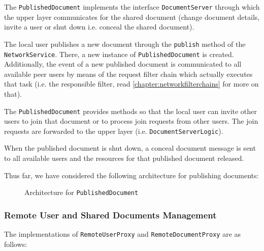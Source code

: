 The \texttt{PublishedDocument} implements the interface \texttt{DocumentServer} through which the upper layer communicates for the shared document (change document details, invite a user or shut down i.e. conceal the shared document).

The local user publishes a new document through the \texttt{publish} method of the \texttt{NetworkService}. There, a new instance of \texttt{PublishedDocument} is created. Additionally, the event of a new published document is communicated to all available peer users by means of the request filter chain which actually executes that task (i.e. the responsible filter, read \ref{chapter:networkfilterchains} for more on that).

The \texttt{PublishedDocument} provides methods so that the local user can invite other users to join that document or to process join requests from other users. The join requests are forwarded to the upper layer (i.e. \texttt{DocumentServerLogic}). 

When the published document is shut down, a conceal document message is sent to all available users and the resources for that published document released.

Thus far, we have considered the following architecture for publishing documents:
\begin{figure}[H]
 \centering
 \caption{Architecture for \texttt{PublishedDocument}}
 \label{fig:network.protocol.architecture1.uml}
\end{figure}


\subsubsection{Remote User and Shared Documents Management}
The implementations of \texttt{RemoteUserProxy} and  \texttt{RemoteDocumentProxy} are as follows:

